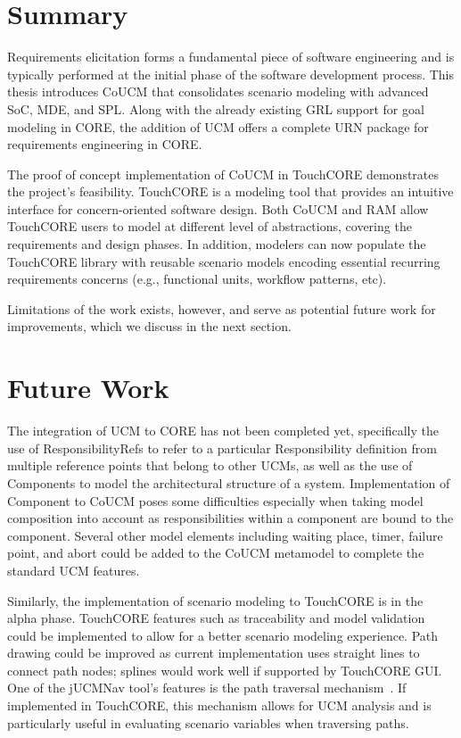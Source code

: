 \section{Summary}

Requirements elicitation forms a fundamental piece of software engineering and is typically performed at the initial phase of the software development process. This thesis introduces CoUCM that consolidates scenario modeling with advanced SoC, MDE, and SPL. Along with the already existing GRL support for goal modeling in CORE, the addition of UCM offers a complete URN package for requirements engineering in CORE.

The proof of concept implementation of CoUCM in TouchCORE demonstrates the project's feasibility. TouchCORE is a modeling tool that provides an intuitive interface for concern-oriented software design. Both CoUCM and RAM allow TouchCORE users to model at different level of abstractions, covering the requirements and design phases. In addition, modelers can now populate the TouchCORE library with reusable scenario models encoding essential recurring requirements concerns (e.g., functional units, workflow patterns, etc).

Limitations of the work exists, however, and serve as potential future work for improvements, which we discuss in the next section.

\section{Future Work}

The integration of UCM to CORE has not been completed yet, specifically the use of {\cls ResponsibilityRef}s to refer to a particular {\cls Responsibility} definition from multiple reference points that belong to other UCMs, as well as the use of {\cls Component}s to model the architectural structure of a system. Implementation of {\cls Component} to CoUCM poses some difficulties especially when taking model composition into account as responsibilities within a component are bound to the component. Several other model elements including waiting place, timer, failure point, and abort could be added to the CoUCM metamodel to complete the standard UCM features.

Similarly, the implementation of scenario modeling to TouchCORE is in the alpha phase. TouchCORE features such as traceability and model validation could be implemented to allow for a better scenario modeling experience. Path drawing could be improved as current implementation uses straight lines to connect path nodes; splines would work well if supported by TouchCORE GUI. One of the jUCMNav tool's features is the path traversal mechanism~\cite{kealey2007enhanced2}. If implemented in TouchCORE, this mechanism allows for UCM analysis and is particularly useful in evaluating scenario variables when traversing paths.


